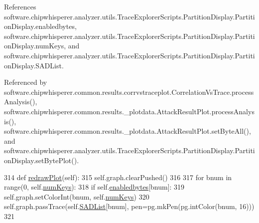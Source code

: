 References software.\+chipwhisperer.\+analyzer.\+utils.\+Trace\+Explorer\+Scripts.\+Partition\+Display.\+Partition\+Display.\+enabledbytes, software.\+chipwhisperer.\+analyzer.\+utils.\+Trace\+Explorer\+Scripts.\+Partition\+Display.\+Partition\+Display.\+num\+Keys, and software.\+chipwhisperer.\+analyzer.\+utils.\+Trace\+Explorer\+Scripts.\+Partition\+Display.\+Partition\+Display.\+S\+A\+D\+List.



Referenced by software.\+chipwhisperer.\+common.\+results.\+corrvstraceplot.\+Correlation\+Vs\+Trace.\+process\+Analysis(), software.\+chipwhisperer.\+common.\+results.\+\_\+plotdata.\+Attack\+Result\+Plot.\+process\+Analysis(), software.\+chipwhisperer.\+common.\+results.\+\_\+plotdata.\+Attack\+Result\+Plot.\+set\+Byte\+All(), and software.\+chipwhisperer.\+analyzer.\+utils.\+Trace\+Explorer\+Scripts.\+Partition\+Display.\+Partition\+Display.\+set\+Byte\+Plot().


\begin{DoxyCode}
314     \textcolor{keyword}{def }\hyperlink{classsoftware_1_1chipwhisperer_1_1analyzer_1_1utils_1_1TraceExplorerScripts_1_1PartitionDisplay_1_1PartitionDisplay_ad78fe7e33e3b6e5ee4a34e22d4884d82}{redrawPlot}(self):
315         self.graph.clearPushed()
316 
317         \textcolor{keywordflow}{for} bnum \textcolor{keywordflow}{in} range(0, self.\hyperlink{classsoftware_1_1chipwhisperer_1_1analyzer_1_1utils_1_1TraceExplorerScripts_1_1PartitionDisplay_1_1PartitionDisplay_a9609f827035095f248787dbde121fa08}{numKeys}):
318             \textcolor{keywordflow}{if} self.\hyperlink{classsoftware_1_1chipwhisperer_1_1analyzer_1_1utils_1_1TraceExplorerScripts_1_1PartitionDisplay_1_1PartitionDisplay_a64d82c9bb535b3e6468f194c1a85e988}{enabledbytes}[bnum]:
319                 self.graph.setColorInt(bnum, self.\hyperlink{classsoftware_1_1chipwhisperer_1_1analyzer_1_1utils_1_1TraceExplorerScripts_1_1PartitionDisplay_1_1PartitionDisplay_a9609f827035095f248787dbde121fa08}{numKeys})
320                 self.graph.passTrace(self.\hyperlink{classsoftware_1_1chipwhisperer_1_1analyzer_1_1utils_1_1TraceExplorerScripts_1_1PartitionDisplay_1_1PartitionDisplay_a72d55c478d4e6a5337ac102db3a17afa}{SADList}[bnum], pen=pg.mkPen(pg.intColor(bnum, 16)))
321 
\end{DoxyCode}
\hypertarget{classsoftware_1_1chipwhisperer_1_1analyzer_1_1utils_1_1TraceExplorerScripts_1_1PartitionDisplay_1_1PartitionDisplay_a8e4cc8eded19439d7e27add80faba362}{}
